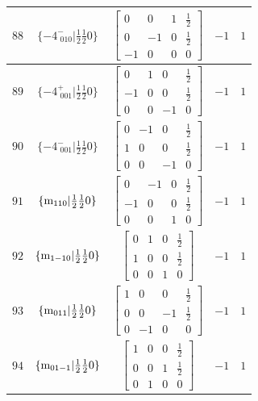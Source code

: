 \documentclass[fleqn,8pt]{jsarticle}
\begin{document}
\begin{longtable}{ccccc}
$ 88 $ & $ \{-4^{-}_{\,\,010}|\frac{1}{2} \frac{1}{2} 0\} $ & $ \begin{bmatrix} 0 & 0 & 1 & \frac{1}{2} \\ 0 & -1 & 0 & \frac{1}{2} \\ -1 & 0 & 0 & 0 \end{bmatrix} $ & $ -1 $ & $ 1 $ \\ \hline
$ 89 $ & $ \{-4^{+}_{\,\,001}|\frac{1}{2} \frac{1}{2} 0\} $ & $ \begin{bmatrix} 0 & 1 & 0 & \frac{1}{2} \\ -1 & 0 & 0 & \frac{1}{2} \\ 0 & 0 & -1 & 0 \end{bmatrix} $ & $ -1 $ & $ 1 $ \\ \hline
$ 90 $ & $ \{-4^{-}_{\,\,001}|\frac{1}{2} \frac{1}{2} 0\} $ & $ \begin{bmatrix} 0 & -1 & 0 & \frac{1}{2} \\ 1 & 0 & 0 & \frac{1}{2} \\ 0 & 0 & -1 & 0 \end{bmatrix} $ & $ -1 $ & $ 1 $ \\ \hline
$ 91 $ & $ \{{\rm m}_{110}|\frac{1}{2} \frac{1}{2} 0\} $ & $ \begin{bmatrix} 0 & -1 & 0 & \frac{1}{2} \\ -1 & 0 & 0 & \frac{1}{2} \\ 0 & 0 & 1 & 0 \end{bmatrix} $ & $ -1 $ & $ 1 $ \\ \hline
$ 92 $ & $ \{{\rm m}_{1-10}|\frac{1}{2} \frac{1}{2} 0\} $ & $ \begin{bmatrix} 0 & 1 & 0 & \frac{1}{2} \\ 1 & 0 & 0 & \frac{1}{2} \\ 0 & 0 & 1 & 0 \end{bmatrix} $ & $ -1 $ & $ 1 $ \\ \hline
$ 93 $ & $ \{{\rm m}_{011}|\frac{1}{2} \frac{1}{2} 0\} $ & $ \begin{bmatrix} 1 & 0 & 0 & \frac{1}{2} \\ 0 & 0 & -1 & \frac{1}{2} \\ 0 & -1 & 0 & 0 \end{bmatrix} $ & $ -1 $ & $ 1 $ \\ \hline
$ 94 $ & $ \{{\rm m}_{01-1}|\frac{1}{2} \frac{1}{2} 0\} $ & $ \begin{bmatrix} 1 & 0 & 0 & \frac{1}{2} \\ 0 & 0 & 1 & \frac{1}{2} \\ 0 & 1 & 0 & 0 \end{bmatrix} $ & $ -1 $ & $ 1 $ \\ \hline

\end{longtable}
\end{document}
